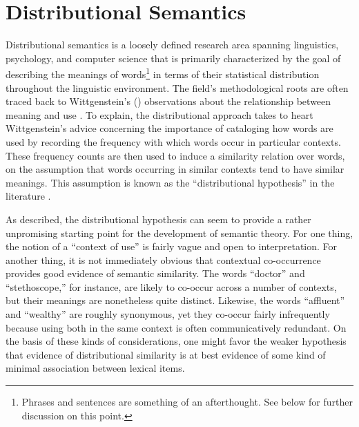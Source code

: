 \section{Distributional Semantics}

Distributional semantics is a loosely defined research area spanning linguistics, psychology, and computer science that is primarily characterized by the goal of describing the meanings of words\footnote{Phrases and sentences are something of an afterthought. See below for further discussion on this point.} in terms of their statistical distribution throughout the linguistic environment. The field's methodological roots are often traced back to Wittgenstein's (\citeyear{Wittgenstein:1953}) observations about the relationship between meaning and use \citep{Baroni:2014,TurneyPantel:2010}. To explain, the distributional approach takes to heart Wittgenstein's advice concerning the importance of cataloging how words are used by recording the frequency with which words occur in particular contexts. These frequency counts are then used to induce a similarity relation over words, on the assumption that words occurring in similar contexts tend to have similar meanings. This assumption is known as the ``distributional hypothesis'' in the literature \citep{Baroni:2014,TurneyPantel:2010,Sahlgren:2005}.

As described, the distributional hypothesis can seem to provide a rather unpromising starting point for the development of semantic theory. For one thing, the notion of a ``context of use'' is fairly vague and open to interpretation. For another thing, it is not immediately obvious that contextual co-occurrence provides good evidence of semantic similarity. The words ``doctor'' and ``stethoscope,'' for instance, are likely to co-occur across a number of contexts, but their meanings are nonetheless quite distinct. Likewise, the words ``affluent'' and ``wealthy'' are roughly synonymous, yet they co-occur fairly infrequently because using both in the same context is often communicatively redundant. On the basis of these kinds of considerations, one might favor the weaker hypothesis that evidence of distributional similarity is at best evidence of some kind of minimal association between lexical items. 

